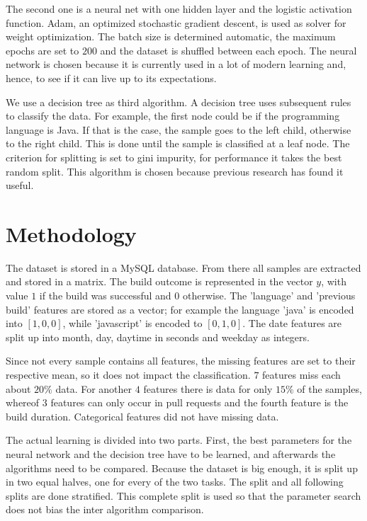 \documentclass[a4paper,11pt]{article}
\begin{document}
The second one is a neural net with one hidden layer and the logistic activation function. Adam\cite{adam}, an optimized stochastic gradient descent, is used as solver for weight optimization. The batch size is determined automatic, the maximum epochs are set to $200$ and the dataset is shuffled between each epoch. The neural network is chosen because it is currently used in a lot of modern learning and, hence, to see if it can live up to its expectations.

We use a decision tree as third algorithm. A decision tree uses subsequent rules to classify the data. For example, the first node could be if the programming language is Java. If that is the case, the sample goes to the left child, otherwise to the right child. This is done until the sample is classified at a leaf node. The criterion for splitting is set to gini impurity, for performance it takes the best random split. This algorithm is chosen because previous research has found it useful.


\section{Methodology}

The dataset is stored in a MySQL database. From there all samples are extracted and stored in a matrix. The build outcome is represented in the vector $y$, with value $1$ if the build was successful and $0$ otherwise. The 'language' and 'previous build' features are stored as a vector; for example the language 'java' is encoded into $[1,0,0]$, while 'javascript' is encoded to $[0,1,0]$. The date features are split up into month, day, daytime in seconds and weekday as integers. 

Since not every sample contains all features, the missing features are set to their respective mean, so it does not impact the classification. 
$7$ features miss each about $20\%$ data. For another $4$ features there is data for only $15\%$ of the samples, whereof $3$ features can only occur in pull requests and the fourth feature is the build duration. 
Categorical features did not have missing data. 

The actual learning is divided into two parts. First, the best parameters for the neural network and the decision tree have to be learned, and afterwards the algorithms need to be compared. Because the dataset is big enough, it is split up in two equal halves, one for every of the two tasks. The split and all following splits are done stratified. This complete split is used so that the parameter search does not bias the inter algorithm comparison. 
\end{document}

